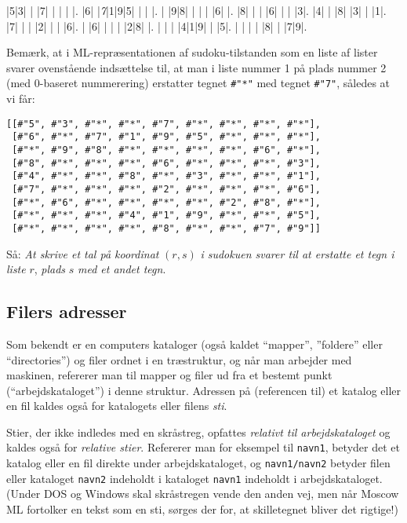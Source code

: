 \documentclass[a4paper]{article}
\begin{document}
\begin{sudoku}
|5|3| | |7| | | | |.
|6| |{\it 7}|1|9|5| | | |.
| |9|8| | | | |6| |.
|8| | | |6| | | |3|.
|4| | |8| |3| | |1|.
|7| | | |2| | | |6|.
| |6| | | | |2|8| |.
| | | |4|1|9| | |5|.
| | | | |8| | |7|9|.
\end{sudoku}


Bem{\ae}rk, at i ML-repr{\ae}sentationen af sudoku-tilstanden som en liste af lister svarer ovenst{\aa}ende inds{\ae}ttelse til,
at man i liste nummer 1 p{\aa} plads nummer 2 (med 0-baseret nummerering)
erstatter tegnet
\texttt{\#"*"} med tegnet \texttt{\#"7"}, s{\aa}ledes at vi f{\aa}r:

\begin{center}
{\small
\begin{verbatim}
[[#"5", #"3", #"*", #"*", #"7", #"*", #"*", #"*", #"*"],
 [#"6", #"*", #"7", #"1", #"9", #"5", #"*", #"*", #"*"],
 [#"*", #"9", #"8", #"*", #"*", #"*", #"*", #"6", #"*"],
 [#"8", #"*", #"*", #"*", #"6", #"*", #"*", #"*", #"3"],
 [#"4", #"*", #"*", #"8", #"*", #"3", #"*", #"*", #"1"],
 [#"7", #"*", #"*", #"*", #"2", #"*", #"*", #"*", #"6"],
 [#"*", #"6", #"*", #"*", #"*", #"*", #"2", #"8", #"*"],
 [#"*", #"*", #"*", #"4", #"1", #"9", #"*", #"*", #"5"],
 [#"*", #"*", #"*", #"*", #"8", #"*", #"*", #"7", #"9"]]
\end{verbatim}
}
\end{center}

S{\aa}: \emph{At skrive et tal p{\aa} koordinat} $(r,s)$ \emph{i sudokuen svarer til at erstatte et tegn i liste} $r$, \emph{plads} $s$ \emph{med et andet tegn}.

\subsection{Filers adresser}\label{sec:filadresser}

Som bekendt er en computers kataloger (ogs{\aa} kaldet ``mapper'', ''foldere'' eller ``directories'')
og filer ordnet i en tr{\ae}struktur, og n{\aa}r man arbejder med maskinen, refererer
man til mapper og filer ud fra et bestemt punkt (``arbejdskataloget'') i denne struktur.
Adressen p{\aa} (referencen til) et katalog eller en fil kaldes ogs{\aa} for
katalogets eller filens \emph{sti}.

Stier, der ikke indledes med en skr{\aa}streg,
opfattes \emph{relativt til arbejdskataloget} og kaldes ogs{\aa} for
\emph{relative stier}.  Refererer man for eksempel til \texttt{navn1},
betyder det et katalog eller en fil direkte under ar\-bejds\-ka\-ta\-log\-et,
og \texttt{navn1/navn2} betyder filen eller kataloget \texttt{navn2}
indeholdt i kataloget \texttt{navn1} indeholdt i arbejdskataloget.
(Under DOS og Windows skal skr{\aa}stregen vende den anden vej,
men n{\aa}r Moscow ML fortolker en tekst som en sti, s{\o}rges
der for, at skilletegnet bliver det rigtige!)
\end{document}
